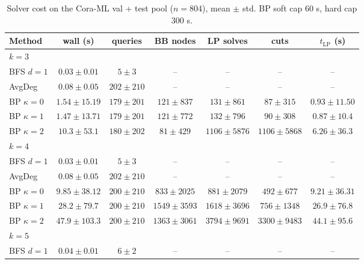 \documentclass[11pt]{article}
\begin{document}
\begin{table}[t]
\centering
\footnotesize
\caption{Solver cost on the Cora-ML val + test pool ($n = 804$),
mean $\pm$ std. BP soft cap $60$ s, hard cap $300$ s.}
\label{tab:cost}
\begin{tabular}{lcccccc}
\toprule
Method & wall (s) & queries & BB nodes & LP solves & cuts & $t_{\text{LP}}$ (s) \\
\midrule
\multicolumn{7}{l}{\textit{$k = 3$}} \\
BFS $d{=}1$       & $0.03 \pm 0.01$  & $5 \pm 3$     & --                & --                  & --                  & --              \\
AvgDeg            & $0.08 \pm 0.05$  & $202 \pm 210$ & --                & --                  & --                  & --              \\
BP $\kappa{=}0$   & $1.54 \pm 15.19$ & $179 \pm 201$ & $121 \pm 837$     & $131 \pm 861$       & $87 \pm 315$        & $0.93 \pm 11.50$ \\
BP $\kappa{=}1$   & $1.47 \pm 13.71$ & $179 \pm 201$ & $121 \pm 772$     & $132 \pm 796$       & $90 \pm 308$        & $0.87 \pm 10.4$ \\
BP $\kappa{=}2$   & $10.3 \pm 53.1$  & $180 \pm 202$ & $81 \pm 429$      & $1106 \pm 5876$     & $1106 \pm 5868$     & $6.26 \pm 36.3$ \\
\midrule
\multicolumn{7}{l}{\textit{$k = 4$}} \\
BFS $d{=}1$       & $0.03 \pm 0.01$  & $5 \pm 3$     & --                & --                  & --                  & --              \\
AvgDeg            & $0.08 \pm 0.05$  & $202 \pm 210$ & --                & --                  & --                  & --              \\
BP $\kappa{=}0$   & $9.85 \pm 38.12$ & $200 \pm 210$ & $833 \pm 2025$    & $881 \pm 2079$      & $492 \pm 677$       & $9.21 \pm 36.31$ \\
BP $\kappa{=}1$   & $28.2 \pm 79.7$  & $200 \pm 210$ & $1549 \pm 3593$   & $1618 \pm 3696$     & $756 \pm 1348$      & $26.9 \pm 76.8$ \\
BP $\kappa{=}2$   & $47.9 \pm 103.3$ & $200 \pm 210$ & $1363 \pm 3061$   & $3794 \pm 9691$     & $3300 \pm 9483$     & $44.1 \pm 95.6$ \\
\midrule
\multicolumn{7}{l}{\textit{$k = 5$}} \\
BFS $d{=}1$       & $0.04 \pm 0.01$  & $6 \pm 2$     & --                & --                  & --                  & --              \\

\end{tabular}
\end{table}
\end{document}
